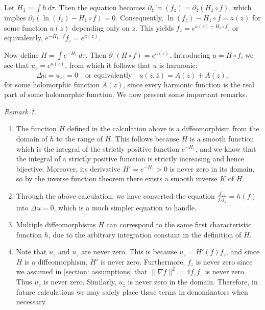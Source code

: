 \documentclass[12pt]{article}
\theoremstyle{plain}
\theoremstyle{definition}
\theoremstyle{remark}
\newtheorem{remark}[theorem]{Remark}
\begin{document}
   Let \(H_1 = \int h\,d\tau\). Then the equation becomes \(\partial_{\bar{z}}\ln(f_z) = \partial_{\bar{z}}(H_1 \circ f)\), which implies \(\partial_{\bar{z}}\left(\ln(f_z) - H_1 \circ f\right) = 0\). Consequently, \(\ln(f_z) - H_1 \circ f = a(z)\) for some function \(a(z)\) depending only on \(z\). This yields \(f_z = e^{a(z) + H_1 \circ f}\), or equivalently, \(e^{- H_1 \circ f}f_z=e^{a(z)}\). 

   Now define \(H = \int e^{-H_1} \, d\tau\). Then \(\partial_z(H \circ f) = e^{a(z)}\). Introducing \(u = H \circ f\), we see that \(u_z = e^{a(z)}\), from which it follows that \(u\) is harmonic:
   \[
     \Delta u=u_{z\bar{z}} = 0 \quad \text{or equivalently} \quad u(z,\bar{z}) = A(z) + \overline{A(z)},
   \]
   for some holomorphic function \(A(z)\), since every harmonic function is the real part of some holomorphic function. We now present some important remarks.

   \begin{remark}
	  \begin{enumerate}
		 \item The function \(H\) defined in the calculation above is a diffeomorphism from the domain of \(h\) to the range of \(H\). This follows because \(H\) is a smooth function which is the integral of the strictly positive function \(e^{-H_1}\), and we know that the integral of a strictly positive function is strictly increasing and hence bijective. Moreover, its derivative \(H' = e^{-H_1} > 0\) is never zero in its domain, so by the inverse function theorem there exists a smooth inverse \(K\) of \(H\).
		
		 \item Through the above calculation, we have converted the equation \(\frac{f_{z\bar{z}}}{f_z f_{\bar{z}}} = h(f)\) into \(\Delta u = 0\), which is a much simpler equation to handle.
		 
		 \item Multiple diffeomorphisms \(H\) can correspond to the same first characteristic function \(h\), due to the arbitrary integration constant in the definition of \(H\).
		
	   	 \item Note that \(u_z\) and \(u_{\bar{z}}\) are never zero. This is because \(u_z = H'(f)f_z\), and since \(H\) is a diffeomorphism, \(H'\) is never zero. Furthermore, \(f_z\) is never zero since we assumed in \ref{section: assumptions} that \(\|\nabla f\|^2 = 4f_z f_{\bar{z}}\) is never zero. Thus \(u_z\) is never zero. Similarly, \(u_{\bar{z}}\) is never zero in the domain. Therefore, in future calculations we may safely place these terms in denominators when necessary.
	 \end{enumerate}
 \end{remark}
  
\end{document}
